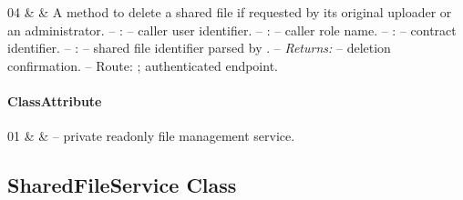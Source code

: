 \begin{ClassMethodTable}
04 & \newline{}\newline{} &
A method to delete a shared file if requested by its original uploader or an administrator.
\newline -- :  -- caller user identifier.
\newline -- :  -- caller role name.
\newline -- :  -- contract identifier.
\newline -- :  -- shared file identifier parsed by .
\newline -- \textit{Returns:}  -- deletion confirmation.
\newline -- Route: ; authenticated endpoint. \\ \hline
\end{ClassMethodTable}

\paragraph{ClassAttribute}
\begin{ClassAttributeTable}
01 &  &  -- private readonly file management service. \\ \hline
\end{ClassAttributeTable}

\subsection{SharedFileService Class}

